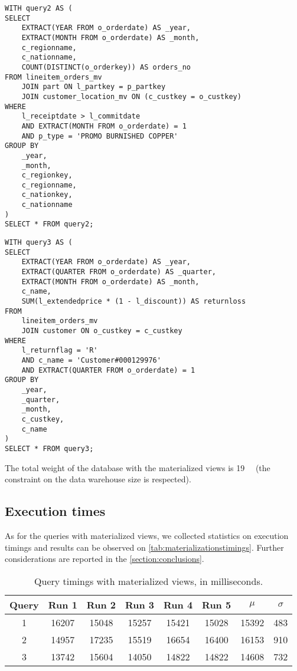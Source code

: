 \begin{lstlisting}
WITH query2 AS (
SELECT 
	EXTRACT(YEAR FROM o_orderdate) AS _year,
	EXTRACT(MONTH FROM o_orderdate) AS _month,
	c_regionname,
	c_nationname,
	COUNT(DISTINCT(o_orderkey)) AS orders_no
FROM lineitem_orders_mv
	JOIN part ON l_partkey = p_partkey
	JOIN customer_location_mv ON (c_custkey = o_custkey)
WHERE 
	l_receiptdate > l_commitdate
	AND EXTRACT(MONTH FROM o_orderdate) = 1
	AND p_type = 'PROMO BURNISHED COPPER'
GROUP BY
	_year,
	_month,
	c_regionkey,
	c_regionname,
	c_nationkey,
	c_nationname
)
SELECT * FROM query2;
\end{lstlisting}

\begin{lstlisting}
WITH query3 AS (
SELECT
	EXTRACT(YEAR FROM o_orderdate) AS _year,
	EXTRACT(QUARTER FROM o_orderdate) AS _quarter,
	EXTRACT(MONTH FROM o_orderdate) AS _month,
	c_name,
	SUM(l_extendedprice * (1 - l_discount)) AS returnloss
FROM
	lineitem_orders_mv
	JOIN customer ON o_custkey = c_custkey
WHERE 
	l_returnflag = 'R'
	AND c_name = 'Customer#000129976'
	AND EXTRACT(QUARTER FROM o_orderdate) = 1
GROUP BY
	_year,
	_quarter,
	_month,
	c_custkey,
	c_name
)
SELECT * FROM query3;
\end{lstlisting}

The total weight of the database with the materialized views is \SI{19}{\giga\byte} (the constraint on the data warehouse size is respected).


\subsection{Execution times}

As for the queries with materialized views, we collected statistics on execution timings and results can be observed on \autoref{tab:materializationstimings}. Further considerations are reported in the \autoref{section:conclusions}.

\begin{table}[!h]
\centering
\begin{tabular}{|| c | c c c c c | c c ||} 
 \hline
 Query & Run 1 & Run 2 & Run 3 & Run 4 & Run 5 & 	$\mu$ & $\sigma$ \\ [0.5ex] 
 \hline\hline
 1 & \num{16207} & \num{15048} & \num{15257} & \num{15421} & \num{15028} & \num{15392} & \num{483} \\ 
 \hline
 2 & \num{14957} & \num{17235} & \num{15519} & \num{16654} & \num{16400} & \num{16153} & \num{910} \\ 
 \hline
 3 & \num{13742} & \num{15604} & \num{14050} & \num{14822} & \num{14822} & \num{14608} & \num{732} \\ 
 \hline
\end{tabular}
  \caption{Query timings with materialized views, in milliseconds.}
  \label{tab:materializationstimings}
\end{table}